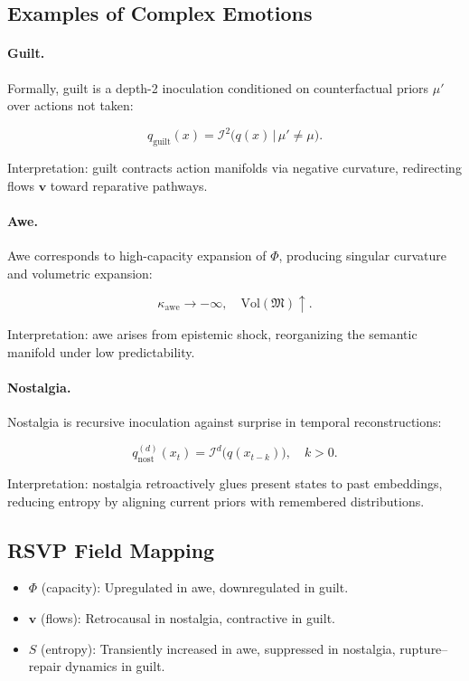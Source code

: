 \documentclass{article}
\theoremstyle{definition}
\begin{document}
\subsection{Examples of Complex Emotions}

\paragraph{Guilt.}  
Formally, guilt is a depth-2 inoculation conditioned on 
counterfactual priors $\mu'$ over actions not taken:

\[
q_{\text{guilt}}(x) 
= \mathcal{I}^2 \big( q(x) \,\big|\, \mu' \neq \mu \big).
\]

Interpretation: guilt contracts action manifolds via negative curvature, 
redirecting flows $\mathbf{v}$ toward reparative pathways.

\paragraph{Awe.}  
Awe corresponds to high-capacity expansion of $\Phi$, producing 
singular curvature and volumetric expansion:

\[
\kappa_{\text{awe}} \to -\infty, 
\quad \mathrm{Vol}(\mathfrak{M}) \uparrow.
\]

Interpretation: awe arises from epistemic shock, reorganizing the 
semantic manifold under low predictability.

\paragraph{Nostalgia.}  
Nostalgia is recursive inoculation against surprise in temporal 
reconstructions:

\[
q^{(d)}_{\text{nost}}(x_t) 
= \mathcal{I}^d \big( q(x_{t-k}) \big), 
\quad k>0.
\]

Interpretation: nostalgia retroactively glues present states to 
past embeddings, reducing entropy by aligning current priors 
with remembered distributions.

\subsection{RSVP Field Mapping}

\begin{itemize}
  \item $\Phi$ (capacity): Upregulated in awe, downregulated in guilt.  
  \item $\mathbf{v}$ (flows): Retrocausal in nostalgia, contractive in guilt.  
  \item $S$ (entropy): Transiently increased in awe, suppressed in nostalgia, 
        rupture–repair dynamics in guilt.  
\end{itemize}
\end{document}

